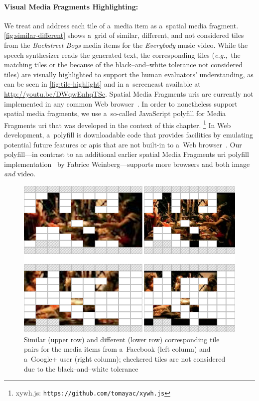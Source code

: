 \paragraph{Visual Media Fragments Highlighting:}

We treat and address each tile of a~media item
as a~spatial media fragment. \autoref{fig:similar-different}
shows a~grid of similar, different, and not considered tiles
from the \emph{Backstreet Boys} media items for the \emph{Everybody} music video.
While the speech synthesizer reads the generated text,
the corresponding tiles (\emph{e.g.},~the matching tiles
or the because of the black--and--white tolerance not considered tiles)
are visually highlighted to support the human evaluators' understanding,
as can be seen in \autoref{fig:tile-highlight}
and in a~screencast available at \url{http://youtu.be/DWqwEnhqTSc}.
Spatial Media Fragments {\sc uri}s are currently not implemented
in any common Web browser~\cite{weinberg2013polyfill}.
In order to nonetheless support spatial media fragments,
we use a~so-called JavaScript polyfill for Media Fragments {\sc uri}
that was developed in the context of this chapter.%
\footnote{xywh.js: \texttt{https://github.com/tomayac/xywh.js}}
In Web development, a~polyfill is downloadable code that provides facilities
by emulating potential future features or {\sc api}s
that are not built-in to a~Web browser~\cite{sharp2010polyfill}.
Our polyfill---in contrast to an additional earlier
spatial Media Fragments {\sc uri} polyfill implementation~\cite{weinberg2013polyfill}
by Fabrice Weinberg---supports more browsers and both image \emph{and} video.

\begin{figure}[!ht]
  \centering
  \includegraphics[width=0.75\linewidth]{./similar-different.png}
  \caption[Similar and different corresponding tile pairs]{Similar (upper row) and different (lower row) corresponding tile pairs for the media items from a~Facebook (left column) and a~Google+ user (right column); checkered tiles are not considered due to the black--and--white tolerance}
  \label{fig:similar-different}
\end{figure}

